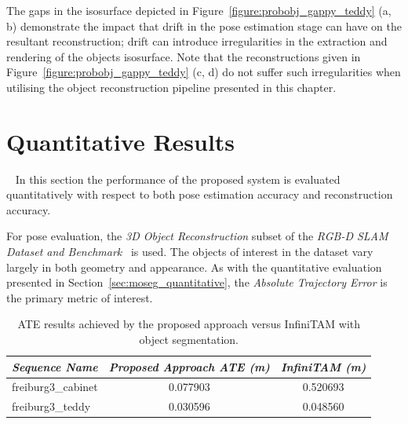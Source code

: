 The gaps in the isosurface depicted in Figure~\ref{figure:probobj_gappy_teddy} (a, b) 
demonstrate the impact that drift in the pose estimation stage can have on the resultant 
reconstruction; drift can introduce irregularities in the extraction and rendering of the objects 
isosurface. Note that the reconstructions given in Figure~\ref{figure:probobj_gappy_teddy} 
(c, d) do not suffer such irregularities when utilising the object reconstruction pipeline 
presented in this chapter.

\section{Quantitative Results}
~\label{sec:probobj_quantitative}
In this section the performance of the proposed system is evaluated quantitatively with respect 
to both pose estimation accuracy and reconstruction accuracy. 

For pose evaluation, the \textit{3D Object Reconstruction} subset of the 
\textit{RGB-D SLAM Dataset and Benchmark}~\cite{Sturm2012} is used. The objects of interest in 
the dataset vary largely in both geometry and appearance. As with the quantitative 
evaluation presented in Section~\ref{sec:moseg_quantitative}, the 
\textit{Absolute Trajectory Error} is the primary metric of interest.
\begin{table}[!htbp]
  \centering
  \begin{tabular}{l c c}
    \emph{Sequence Name} & \emph{Proposed Approach ATE (m)} & \emph{InfiniTAM (m)}\\
    \midrule
    \textsf{freiburg3\_cabinet} & 0.077903 & 0.520693\\
    \textsf{freiburg3\_teddy}   & 0.030596 & 0.048560%
  \end{tabular}
  \caption[Probabilistic Object Reconstruction ATE]
  {ATE results achieved by the proposed approach versus InfiniTAM with object segmentation.}
~\label{table:probobj_ate}
\end{table}

